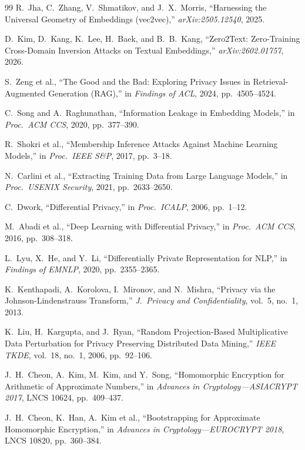 \documentclass[11pt,a4paper]{article}
\begin{document}
\begin{thebibliography}{99}
 R.\ Jha, C.\ Zhang, V.\ Shmatikov, and J.\ X.\ Morris,
``Harnessing the Universal Geometry of Embeddings (vec2vec),''
\emph{arXiv:2505.12540}, 2025.

 D.\ Kim, D.\ Kang, K.\ Lee, H.\ Baek, and
B.\ B.\ Kang, ``Zero2Text: Zero-Training Cross-Domain Inversion Attacks on
Textual Embeddings,'' \emph{arXiv:2602.01757}, 2026.

 S.\ Zeng et al., ``The Good and the Bad:
Exploring Privacy Issues in Retrieval-Augmented Generation (RAG),''
in \emph{Findings of ACL}, 2024, pp.\ 4505--4524.

 C.\ Song and A.\ Raghunathan, ``Information
Leakage in Embedding Models,'' in \emph{Proc.\ ACM CCS}, 2020,
pp.\ 377--390.

 R.\ Shokri et al., ``Membership Inference Attacks
Against Machine Learning Models,'' in \emph{Proc.\ IEEE S\&P},
2017, pp.\ 3--18.

 N.\ Carlini et al., ``Extracting Training Data
from Large Language Models,'' in \emph{Proc.\ USENIX Security},
2021, pp.\ 2633--2650.

 C.\ Dwork, ``Differential Privacy,'' in
\emph{Proc.\ ICALP}, 2006, pp.\ 1--12.

 M.\ Abadi et al., ``Deep Learning with Differential
Privacy,'' in \emph{Proc.\ ACM CCS}, 2016, pp.\ 308--318.

 L.\ Lyu, X.\ He, and Y.\ Li, ``Differentially Private
Representation for NLP,'' in \emph{Findings of EMNLP}, 2020,
pp.\ 2355--2365.

 K.\ Kenthapadi, A.\ Korolova, I.\ Mironov, and
N.\ Mishra, ``Privacy via the Johnson-Lindenstrauss Transform,''
\emph{J.\ Privacy and Confidentiality}, vol.\ 5, no.\ 1, 2013.

 K.\ Liu, H.\ Kargupta, and J.\ Ryan,
``Random Projection-Based Multiplicative Data Perturbation for Privacy
Preserving Distributed Data Mining,'' \emph{IEEE TKDE}, vol.\ 18,
no.\ 1, 2006, pp.\ 92--106.

 J.\ H.\ Cheon, A.\ Kim, M.\ Kim, and Y.\ Song,
``Homomorphic Encryption for Arithmetic of Approximate Numbers,'' in
\emph{Advances in Cryptology---ASIACRYPT 2017}, LNCS 10624, pp.\ 409--437.

 J.\ H.\ Cheon, K.\ Han, A.\ Kim et al.,
``Bootstrapping for Approximate Homomorphic Encryption,'' in
\emph{Advances in Cryptology---EUROCRYPT 2018}, LNCS 10820,
pp.\ 360--384.


\end{thebibliography}
\end{document}
